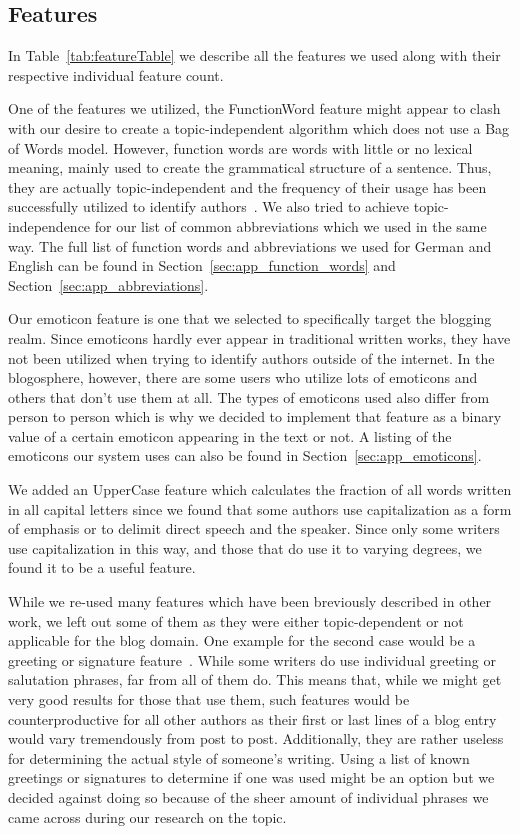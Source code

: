 \subsection{Features}
\label{sec:impl_features}

In Table~\ref{tab:featureTable} we describe all the features we used along with their respective individual feature count.


One of the features we utilized, the FunctionWord feature might appear to clash with our desire to create a topic-independent algorithm which does not use a Bag of Words model.
However, function words are words with little or no lexical meaning, mainly used to create the grammatical structure of a sentence.
Thus, they are actually topic-independent and the frequency of their usage has been successfully utilized to identify authors~\cite{mosteller1962applied}.
We also tried to achieve topic-independence for our list of common abbreviations which we used in the same way.
The full list of function words and abbreviations we used for German and English can be found in Section~\ref{sec:app_function_words} and Section~\ref{sec:app_abbreviations}.


Our emoticon feature is one that we selected to specifically target the blogging realm.
Since emoticons hardly ever appear in traditional written works, they have not been utilized when trying to identify authors outside of the internet.
In the blogosphere, however, there are some users who utilize lots of emoticons and others that don't use them at all.
The types of emoticons used also differ from person to person which is why we decided to implement that feature as a binary value of a certain emoticon appearing in the text or not.
A listing of the emoticons our system uses can also be found in Section~\ref{sec:app_emoticons}.


We added an UpperCase feature which calculates the fraction of all words written in all capital letters since we found that some authors use capitalization as a form of emphasis or to delimit direct speech and the speaker.
Since only some writers use capitalization in this way, and those that do use it to varying degrees, we found it to be a useful feature.


While we re-used many features which have been breviously described in other work, we left out some of them as they were either topic-dependent or not applicable for the blog domain.
One example for the second case would be a greeting or signature feature~\cite{de2001mining}.
While some writers do use individual greeting or salutation phrases, far from all of them do.
This means that, while we might get very good results for those that use them, such features would be counterproductive for all other authors as their first or last lines of a blog entry would vary tremendously from post to post.
Additionally, they are rather useless for determining the actual style of someone's writing.
Using a list of known greetings or signatures to determine if one was used might be an option but we decided against doing so because of the sheer amount of individual phrases we came across during our research on the topic.


